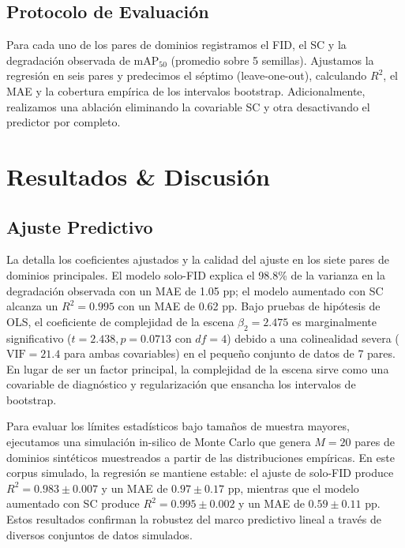 \documentclass[10pt,twocolumn,letterpaper]{article}
\begin{document}
\subsection{Protocolo de Evaluación}
Para cada uno de los pares de dominios registramos el FID, el SC y la degradación observada de mAP$_{50}$ (promedio sobre 5 semillas). Ajustamos la regresión en seis pares y predecimos el séptimo (leave-one-out), calculando $R^2$, el MAE y la cobertura empírica de los intervalos bootstrap. Adicionalmente, realizamos una ablación eliminando la covariable SC y otra desactivando el predictor por completo.

\section{Resultados \& Discusión}

\subsection{Ajuste Predictivo}
La  detalla los coeficientes ajustados y la calidad del ajuste en los siete pares de dominios principales. El modelo solo-FID explica el 98.8\% de la varianza en la degradación observada con un MAE de 1.05 pp; el modelo aumentado con SC alcanza un $R^2 = 0.995$ con un MAE de 0.62 pp. Bajo pruebas de hipótesis de OLS, el coeficiente de complejidad de la escena $\beta_2 = 2.475$ es marginalmente significativo ($t = 2.438, p = 0.0713$ con $df=4$) debido a una colinealidad severa ($\text{VIF} = 21.4$ para ambas covariables) en el pequeño conjunto de datos de 7 pares. En lugar de ser un factor principal, la complejidad de la escena sirve como una covariable de diagnóstico y regularización que ensancha los intervalos de bootstrap.

Para evaluar los límites estadísticos bajo tamaños de muestra mayores, ejecutamos una simulación in-silico de Monte Carlo que genera $M=20$ pares de dominios sintéticos muestreados a partir de las distribuciones empíricas. En este corpus simulado, la regresión se mantiene estable: el ajuste de solo-FID produce $R^2 = 0.983 \pm 0.007$ y un MAE de $0.97 \pm 0.17$ pp, mientras que el modelo aumentado con SC produce $R^2 = 0.995 \pm 0.002$ y un MAE de $0.59 \pm 0.11$ pp. Estos resultados confirman la robustez del marco predictivo lineal a través de diversos conjuntos de datos simulados.
\end{document}
